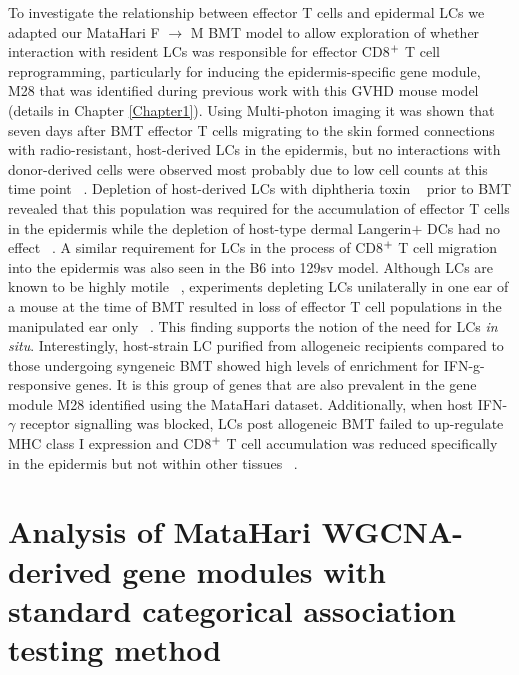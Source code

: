 To investigate the relationship between effector T cells and epidermal LCs we adapted our MataHari F $\to$ M BMT model to allow exploration of whether interaction with resident LCs was responsible for effector CD8$\textsuperscript{+}$ T cell reprogramming, particularly for inducing the epidermis-specific gene module, M28 that was identified during previous work with this GVHD mouse model (details in Chapter \ref{Chapter1}). Using Multi-photon imaging it was shown that seven days after BMT effector T cells migrating to the skin formed connections with radio-resistant, host-derived LCs in the epidermis, but no interactions with donor-derived cells were observed most probably due to low cell counts at this time point ~\autocite{Santos}. Depletion of host-derived LCs with diphtheria toxin ~\autocite{Ben2005,Kis2005} prior to BMT revealed that this population was required for the accumulation of effector T cells in the epidermis while the depletion of host-type dermal Langerin$+$ DCs had no effect ~\autocite{Santos}. A similar requirement for LCs in the process of CD8$\textsuperscript{+}$ T cell migration into the epidermis was also seen in the B6 into 129sv model. Although LCs are known to be highly motile ~\autocite{Kis2005}, experiments depleting LCs unilaterally in one ear of a mouse at the time of BMT resulted in loss of effector T cell populations in the manipulated ear only ~\autocite{Santos}. This finding supports the notion of the need for LCs \textit{in situ}. Interestingly, host-strain LC purified from allogeneic recipients compared to those undergoing syngeneic BMT showed high levels of enrichment for IFN-g-responsive genes. It is this group of genes that are also prevalent in the gene module M28 identified using the MataHari dataset. Additionally, when host IFN-$\gamma$ receptor signalling was blocked, LCs post allogeneic BMT failed to up-regulate MHC class I expression and CD8$\textsuperscript{+}$ T cell accumulation was reduced specifically in the epidermis but not within other tissues ~\autocite{Santos}.

\section{Analysis of MataHari WGCNA-derived gene modules with standard categorical association testing method} 

